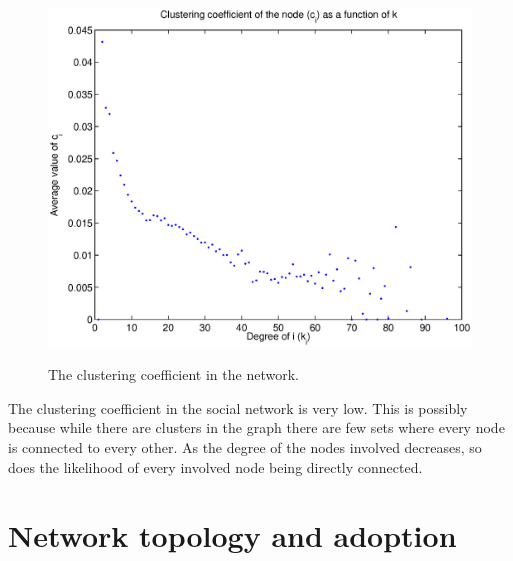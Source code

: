\documentclass[12pt]{article}
\begin{document}
\begin{figure}[H]
\includegraphics[trim = 0cm 0cm 0cm 0cm, width = .9\textwidth]{Graficos/clusteringcoeff.eps}
\label{fig:cluster}
\caption{The clustering coefficient in the network.}
\end{figure}

The clustering coefficient in the social network is very low. This is possibly because while there are clusters in the graph there are few sets where every node is connected to every other. As the degree of the nodes involved decreases, so does the likelihood of every involved node being directly connected.

\section{Network topology and adoption}

%
\end{document}
